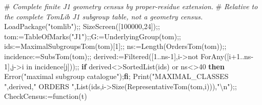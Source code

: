 \documentclass[
  10pt,
  letterpaper,
]{article}
\newenvironment{Shaded}{}{}
\newcommand{\BuiltInTok}[1]{\textcolor[rgb]{0.00,0.50,0.00}{#1}}
\newcommand{\CommentTok}[1]{\textcolor[rgb]{0.38,0.63,0.69}{\textit{#1}}}
\newcommand{\ConstantTok}[1]{\textcolor[rgb]{0.53,0.00,0.00}{#1}}
\newcommand{\ControlFlowTok}[1]{\textcolor[rgb]{0.00,0.44,0.13}{\textbf{#1}}}
\newcommand{\ExtensionTok}[1]{#1}
\newcommand{\FloatTok}[1]{\textcolor[rgb]{0.25,0.63,0.44}{#1}}
\newcommand{\FunctionTok}[1]{\textcolor[rgb]{0.02,0.16,0.49}{#1}}
\newcommand{\NormalTok}[1]{#1}
\newcommand{\OperatorTok}[1]{\textcolor[rgb]{0.40,0.40,0.40}{#1}}
\newcommand{\StringTok}[1]{\textcolor[rgb]{0.25,0.44,0.63}{#1}}
\newcommand{\VariableTok}[1]{\textcolor[rgb]{0.10,0.09,0.49}{#1}}
\begin{document}
\begin{Shaded}
\begin{Highlighting}[]
\NormalTok{\#}\CommentTok{ Complete finite J1 geometry census by proper{-}residue extension.}
\NormalTok{\#}\CommentTok{ Relative to the complete TomLib J1 subgroup table, not a geometry census.}
\BuiltInTok{LoadPackage}\NormalTok{(}\StringTok{"tomlib"}\NormalTok{)}\OperatorTok{;;}
\BuiltInTok{SizeScreen}\NormalTok{([}\FloatTok{100000}\OperatorTok{,}\FloatTok{24}\NormalTok{])}\OperatorTok{;;}
\VariableTok{tom}\OperatorTok{:=}\BuiltInTok{TableOfMarks}\NormalTok{(}\StringTok{"J1"}\NormalTok{)}\OperatorTok{;;}\VariableTok{G}\OperatorTok{:=}\BuiltInTok{UnderlyingGroup}\NormalTok{(}\VariableTok{tom}\NormalTok{)}\OperatorTok{;;}
\VariableTok{ids}\OperatorTok{:=}\BuiltInTok{MaximalSubgroupsTom}\NormalTok{(}\VariableTok{tom}\NormalTok{)[}\FloatTok{1}\NormalTok{]}\OperatorTok{;;}
\VariableTok{ns}\OperatorTok{:=}\BuiltInTok{Length}\NormalTok{(}\BuiltInTok{OrdersTom}\NormalTok{(}\VariableTok{tom}\NormalTok{))}\OperatorTok{;;} \VariableTok{incidence}\OperatorTok{:=}\BuiltInTok{SubsTom}\NormalTok{(}\VariableTok{tom}\NormalTok{)}\OperatorTok{;;}
\VariableTok{derived}\OperatorTok{:=}\BuiltInTok{Filtered}\NormalTok{([}\FloatTok{1}\OperatorTok{..}\VariableTok{ns}\OperatorTok{{-}}\FloatTok{1}\NormalTok{]}\OperatorTok{,}\VariableTok{i}\OperatorTok{{-}\textgreater{}}\ConstantTok{not} \BuiltInTok{ForAny}\NormalTok{([}\VariableTok{i}\OperatorTok{+}\FloatTok{1}\OperatorTok{..}\VariableTok{ns}\OperatorTok{{-}}\FloatTok{1}\NormalTok{]}\OperatorTok{,}\VariableTok{j}\OperatorTok{{-}\textgreater{}}\VariableTok{i} \ExtensionTok{in} \VariableTok{incidence}\NormalTok{[}\VariableTok{j}\NormalTok{]))}\OperatorTok{;;}
\ControlFlowTok{if} \VariableTok{derived}\OperatorTok{\textless{}\textgreater{}}\BuiltInTok{SortedList}\NormalTok{(}\VariableTok{ids}\NormalTok{) }\ConstantTok{or} \VariableTok{ns}\OperatorTok{\textless{}\textgreater{}}\FloatTok{40} \ControlFlowTok{then} \BuiltInTok{Error}\NormalTok{(}\StringTok{"maximal subgroup catalogue"}\NormalTok{)}\OperatorTok{;}\ControlFlowTok{fi}\OperatorTok{;}
\BuiltInTok{Print}\NormalTok{(}\StringTok{"MAXIMAL\_CLASSES "}\OperatorTok{,}\VariableTok{derived}\OperatorTok{,}\StringTok{" ORDERS "}\OperatorTok{,}\BuiltInTok{List}\NormalTok{(}\VariableTok{ids}\OperatorTok{,}\VariableTok{i}\OperatorTok{{-}\textgreater{}}\BuiltInTok{Size}\NormalTok{(}\BuiltInTok{RepresentativeTom}\NormalTok{(}\VariableTok{tom}\OperatorTok{,}\VariableTok{i}\NormalTok{)))}\OperatorTok{,}\StringTok{"\textbackslash{}n"}\NormalTok{)}\OperatorTok{;;}
\VariableTok{CheckCensus}\OperatorTok{:=}\FunctionTok{function}\NormalTok{(}\VariableTok{t}\NormalTok{)}

\end{Highlighting}
\end{Shaded}
\end{document}
